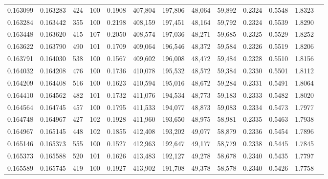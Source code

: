 \begin{tabular}{rrrrrrrrrrrrr}
0.163099 & 0.163283 &   424 & 100 &                                     0.1908 & 407,804 & 197,806 &  48,064 &  59,892 & 0.2324 & 0.5548 & 1.8323 \\
0.163284 & 0.163442 &   355 & 100 &                                     0.2198 & 408,159 & 197,451 &  48,164 &  59,792 & 0.2324 & 0.5539 & 1.8290 \\
0.163448 & 0.163620 &   415 & 107 &                                     0.2050 & 408,574 & 197,036 &  48,271 &  59,685 & 0.2325 & 0.5529 & 1.8252 \\
0.163622 & 0.163790 &   490 & 101 &                                     0.1709 & 409,064 & 196,546 &  48,372 &  59,584 & 0.2326 & 0.5519 & 1.8206 \\
0.163791 & 0.164030 &   538 & 100 &                                     0.1567 & 409,602 & 196,008 &  48,472 &  59,484 & 0.2328 & 0.5510 & 1.8156 \\
0.164032 & 0.164208 &   476 & 100 &                                     0.1736 & 410,078 & 195,532 &  48,572 &  59,384 & 0.2330 & 0.5501 & 1.8112 \\
0.164209 & 0.164408 &   516 & 100 &                                     0.1623 & 410,594 & 195,016 &  48,672 &  59,284 & 0.2331 & 0.5491 & 1.8064 \\
0.164410 & 0.164562 &   482 & 101 &                                     0.1732 & 411,076 & 194,534 &  48,773 &  59,183 & 0.2333 & 0.5482 & 1.8020 \\
0.164564 & 0.164745 &   457 & 100 &                                     0.1795 & 411,533 & 194,077 &  48,873 &  59,083 & 0.2334 & 0.5473 & 1.7977 \\
0.164748 & 0.164967 &   427 & 102 &                                     0.1928 & 411,960 & 193,650 &  48,975 &  58,981 & 0.2335 & 0.5463 & 1.7938 \\
0.164967 & 0.165145 &   448 & 102 &                                     0.1855 & 412,408 & 193,202 &  49,077 &  58,879 & 0.2336 & 0.5454 & 1.7896 \\
0.165146 & 0.165373 &   555 & 100 &                                     0.1527 & 412,963 & 192,647 &  49,177 &  58,779 & 0.2338 & 0.5445 & 1.7845 \\
0.165373 & 0.165588 &   520 & 101 &                                     0.1626 & 413,483 & 192,127 &  49,278 &  58,678 & 0.2340 & 0.5435 & 1.7797 \\
0.165589 & 0.165745 &   419 & 100 &                                     0.1927 & 413,902 & 191,708 &  49,378 &  58,578 & 0.2340 & 0.5426 & 1.7758 \\

\end{tabular}
